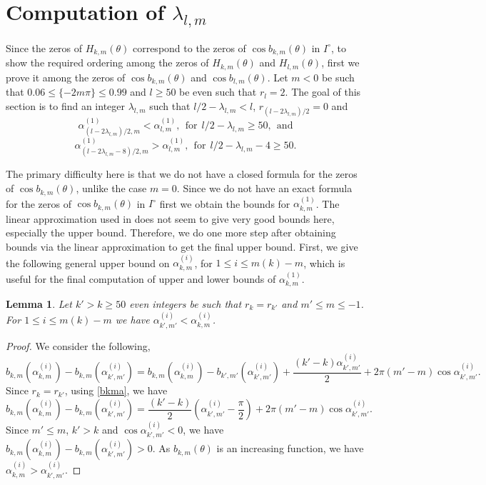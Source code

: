 \documentclass[12pt,reqno]{amsart}
\newtheorem{lem}{Lemma}
\begin{document}
\section{Computation of $\lambda_{l,m}$}
Since the zeros of $H_{k,m}(\theta)$ correspond to the zeros of $\cos b_{k,m}(\theta)$ in $I^{\circ}$, to show the 
required ordering among the zeros of $H_{k,m}(\theta)$ and $H_{l,m}(\theta)$, first we prove it
among the zeros of $\cos b_{k,m}(\theta)$ and $\cos b_{l,m}(\theta)$. Let $m<0$ be such that $0.06\le\{-2m\pi\}\le0.99$ and $l\ge 50$ be even such that 
$r_l=2$. The goal of this section is to find an integer $\lambda_{l,m}$  such that $l/2-\lambda_{l,m}<l$, $r_{(l-2\lambda_{l,m})/2}=0$ and
$$
    \alpha_{(l-2\lambda_{l,m})/2,m}^{(1)}<\alpha_{l,m}^{(1)}, \ \ \text{for}\ \ l/2-\lambda_{l,m}\ge 50,\ \  \text{and}
    $$
    $$
\alpha_{(l-2\lambda_{l,m}-8)/2,m}^{(1)}>\alpha_{l,m}^{(1)},    \ \ \text{for}\ \ l/2-\lambda_{l,m}-4\ge50.
$$




The primary difficulty here is that we do not have a closed formula for the 
zeros of $\cos b_{k,m}(\theta)$, unlike the case $m=0$.
Since we do not have an exact formula for the zeros of $\cos b_{k,m}(\theta)$ in $I^{\circ}$ first we obtain 
the bounds for $\alpha_{k,m}^{(1)}$. The linear approximation used in \cite{KS2} does not seem to give very good bounds here, especially the upper bound. Therefore, we do one more step after obtaining bounds via the linear approximation to get the final upper bound. 
First, we give the following general upper bound 
on $\alpha_{k,m}^{(i)}$, for $1\le i\le m(k)-m$, which is useful for the final computation of upper and lower bounds of $\alpha_{k,m}^{(1)}.$

\begin{lem}\label{1st zero}
Let $k'>k\ge50$ even integers be such that $r_k=r_{k'}$ and $m'\le m\le -1$. For $1\le i\le m(k)-m$ we have $\alpha_{k',m'}^{(i)}<\alpha_{k,m}^{(i)}$.
\end{lem}
\begin{proof}
We consider the following, 
$$
b_{k,m}(\alpha_{k,m}^{(i)})-b_{k,m}(\alpha_{k',m'}^{(i)})=
b_{k,m}(\alpha_{k,m}^{(i)})-b_{k',m'}(\alpha_{k',m'}^{(i)})+\frac{(k'-k)\alpha_{k',m'}^{(i)}}{2}+2\pi(m'-m)\cos\alpha_{k',m'}^{(i)}.
$$
Since $r_k=r_{k'}$, using \eqref{bkma}, we have
$$ 
b_{k,m}(\alpha_{k,m}^{(i)})-b_{k,m}(\alpha_{k',m'}^{(i)})=\frac{(k'-k)}{2}\left(\alpha_{k',m'}^{(i)}-\frac{\pi}{2}\right)+2\pi(m'-m)\cos\alpha_{k',m'}^{(i)}.
$$
Since $m'\le m$, $k'>k$ and $\cos\alpha_{k',m'}^{(i)}<0$, we have $b_{k,m}(\alpha_{k,m}^{(i)})-b_{k,m}(\alpha_{k',m'}^{(i)})>0$.
As $b_{k,m}(\theta)$ is an increasing function, we have $\alpha_{k,m}^{(i)}>\alpha_{k',m'}^{(i)}$.
\end{proof}
\end{document}
